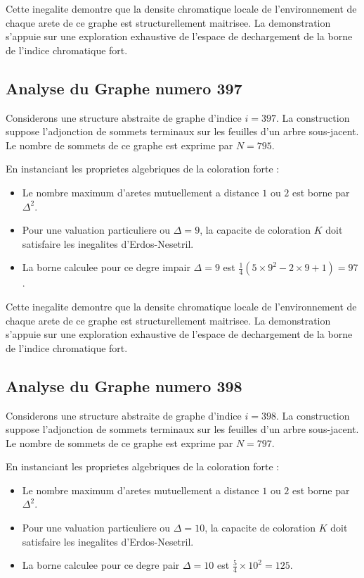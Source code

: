 \documentclass[11pt,a4paper]{article}
\begin{document}
Cette inegalite demontre que la densite chromatique locale de l'environnement de chaque arete de ce graphe est structurellement maitrisee. La demonstration s'appuie sur une exploration exhaustive de l'espace de dechargement de la borne de l'indice chromatique fort.

\subsection{Analyse du Graphe numero 397}
Considerons une structure abstraite de graphe d'indice $i = 397$. La construction suppose l'adjonction de sommets terminaux sur les feuilles d'un arbre sous-jacent. Le nombre de sommets de ce graphe est exprime par $N = 795$.

En instanciant les proprietes algebriques de la coloration forte :
\begin{itemize}
\item Le nombre maximum d'aretes mutuellement a distance $1$ ou $2$ est borne par $\Delta^2$.
\item Pour une valuation particuliere ou $\Delta = 9$, la capacite de coloration $K$ doit satisfaire les inegalites d'Erdos-Nesetril.
\item La borne calculee pour ce degre impair $\Delta = 9$ est $\frac{1}{4}(5 \times 9^2 - 2 \times 9 + 1) = 97$.
\end{itemize}

Cette inegalite demontre que la densite chromatique locale de l'environnement de chaque arete de ce graphe est structurellement maitrisee. La demonstration s'appuie sur une exploration exhaustive de l'espace de dechargement de la borne de l'indice chromatique fort.

\subsection{Analyse du Graphe numero 398}
Considerons une structure abstraite de graphe d'indice $i = 398$. La construction suppose l'adjonction de sommets terminaux sur les feuilles d'un arbre sous-jacent. Le nombre de sommets de ce graphe est exprime par $N = 797$.

En instanciant les proprietes algebriques de la coloration forte :
\begin{itemize}
\item Le nombre maximum d'aretes mutuellement a distance $1$ ou $2$ est borne par $\Delta^2$.
\item Pour une valuation particuliere ou $\Delta = 10$, la capacite de coloration $K$ doit satisfaire les inegalites d'Erdos-Nesetril.
\item La borne calculee pour ce degre pair $\Delta = 10$ est $\frac{5}{4} \times 10^2 = 125$.
\end{itemize}
\end{document}
